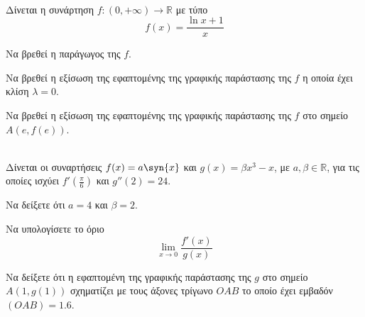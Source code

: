 \documentclass[ektypwsh]{frontisthrio-diag}
\begin{document}
\begin{thema}
\begin{multicols}{2}
\begin{erwthma}
\end{erwthma}
\end{multicols}
\item\mbox{}\\
Δίνεται η συνάρτηση $ f:(0,+\infty)\to\mathbb{R} $ με τύπο
\[ f(x)=\frac{\ln{x}+1}{x} \]
\begin{erwthma}
\item Να βρεθεί η παράγωγος της $ f $.
\item Να βρεθεί η εξίσωση της εφαπτομένης της γραφικής παράστασης της $f$ η οποία έχει κλίση $\lambda=0$.\\
\item Να βρεθεί η εξίσωση της εφαπτομένης της γραφικής παράστασης της $f$ στο σημείο $A(e,f(e))$.\\
\end{erwthma} 
\item\mbox{}\\
Δίνεται οι συναρτήσεις $f(x)=a\syn{x}$ και $g(x)=\beta x^3-x$, με $a,\beta\in\mathbb{R}$, για τις οποίες ισχύει $f'\left(\frac{\pi}{6}\right)$ και $g''(2)=24$.
\begin{erwthma}
\item Να δείξετε ότι $a=4$ και $\beta=2$.
\item Να υπολογίσετε το όριο 
\[\lim_{x\to 0}{\frac{f'(x)}{g(x)}} \]
\item Να δείξετε ότι η εφαπτομένη της γραφικής παράστασης της $g$ στο σημείο $A(1,g(1))$ σχηματίζει με τους άξονες τρίγωνο $OAB$ το οποίο έχει εμβαδόν $(OAB)=1.6$.
\end{erwthma}
\end{thema}
\end{document}
